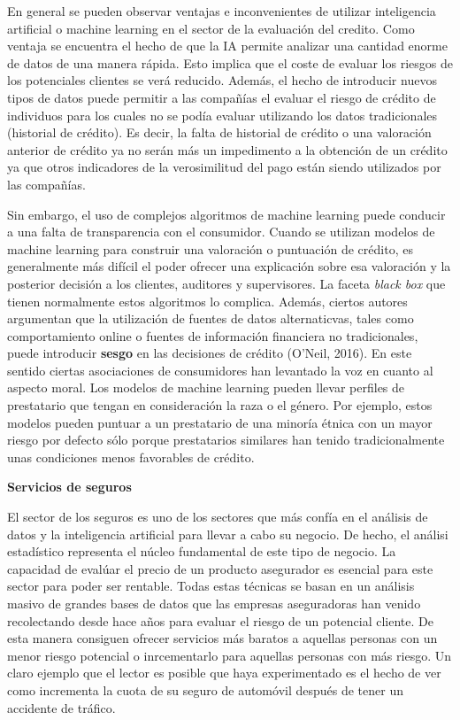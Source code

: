 \documentclass[]{DissertateUSU}
\begin{document}
\noindent En general se pueden observar ventajas e inconvenientes de
utilizar inteligencia artificial o machine learning en el sector de la
evaluación del credito. Como ventaja se encuentra el hecho de que la IA
permite analizar una cantidad enorme de datos de una manera rápida. Esto
implica que el coste de evaluar los riesgos de los potenciales clientes
se verá reducido. Además, el hecho de introducir nuevos tipos de datos
puede permitir a las compañías el evaluar el riesgo de crédito de
individuos para los cuales no se podía evaluar utilizando los datos
tradicionales (historial de crédito). Es decir, la falta de historial de
crédito o una valoración anterior de crédito ya no serán más un
impedimento a la obtención de un crédito ya que otros indicadores de la
verosimilitud del pago están siendo utilizados por las compañías.

\setlength\parskip{5ex}

\noindent Sin embargo, el uso de complejos algoritmos de machine
learning puede conducir a una falta de transparencia con el consumidor.
Cuando se utilizan modelos de machine learning para construir una
valoración o puntuación de crédito, es generalmente más difícil el poder
ofrecer una explicación sobre esa valoración y la posterior decisión a
los clientes, auditores y supervisores. La faceta \emph{black box} que
tienen normalmente estos algoritmos lo complica. Además, ciertos autores
argumentan que la utilización de fuentes de datos alternaticvas, tales
como comportamiento online o fuentes de información financiera no
tradicionales, puede introducir \textbf{sesgo} en las decisiones de
crédito (O'Neil, 2016). En este sentido ciertas asociaciones de
consumidores han levantado la voz en cuanto al aspecto moral. Los
modelos de machine learning pueden llevar perfiles de prestatario que
tengan en consideración la raza o el género. Por ejemplo, estos modelos
pueden puntuar a un prestatario de una minoría étnica con un mayor
riesgo por defecto sólo porque prestatarios similares han tenido
tradicionalmente unas condiciones menos favorables de crédito.

\setlength\parskip{5ex}

\textbf{Servicios de seguros}

\noindent El sector de los seguros es uno de los sectores que más confía
en el análisis de datos y la inteligencia artificial para llevar a cabo
su negocio. De hecho, el análisi estadístico representa el núcleo
fundamental de este tipo de negocio. La capacidad de evalúar el precio
de un producto asegurador es esencial para este sector para poder ser
rentable. Todas estas técnicas se basan en un análisis masivo de grandes
bases de datos que las empresas aseguradoras han venido recolectando
desde hace años para evaluar el riesgo de un potencial cliente. De esta
manera consiguen ofrecer servicios más baratos a aquellas personas con
un menor riesgo potencial o inrcementarlo para aquellas personas con más
riesgo. Un claro ejemplo que el lector es posible que haya experimentado
es el hecho de ver como incrementa la cuota de su seguro de automóvil
después de tener un accidente de tráfico.
\end{document}
